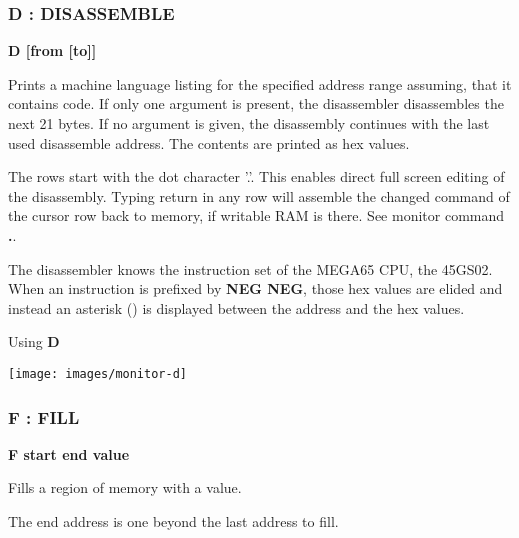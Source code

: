 
\subsubsection{D : DISASSEMBLE}
\begin{description}[leftmargin=2cm,style=nextline]
\item [Format:] {\bf D [from [to]]}
\item [Usage:] Prints a machine language listing for the specified
               address range assuming, that it contains code.
               If only one argument is present, the disassembler
               disassembles the next 21 bytes. If no argument is
               given, the disassembly continues with the last used
               disassemble address.
               The contents are printed as hex values.

\item [Remarks:] The rows start with the dot character '.'.
                 This enables direct full screen editing of the disassembly.
                 Typing return in any row will assemble the changed
                 command of the cursor row back to memory, if writable RAM is there.
                 See monitor command {\bf .}.

                 The disassembler knows the instruction set of the MEGA65 CPU, the
                 45GS02. When an instruction is prefixed by {\bf NEG NEG}, those hex values
                 are elided and instead an asterisk ({\bf *}) is displayed between the address
                 and the hex values.

\item [Example:] Using {\bf D}
\end{description}
\texttt{[image: images/monitor-d]}


\subsubsection{F : FILL}
\begin{description}[leftmargin=2cm,style=nextline]
\item [Format:] {\bf F start end value}
\item [Usage:] Fills a region of memory with a value.

\item [Remarks:] The end address is one beyond the last address to fill.
\end{description}

